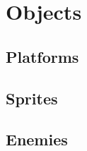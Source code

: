 \chapter{Objects}
\label{cha:objects}

\section{Platforms}
\label{sec:objects-platforms}


\section{Sprites}
\label{sec:objects-sprites}


\section{Enemies}
\label{sec:objects-enemies}

